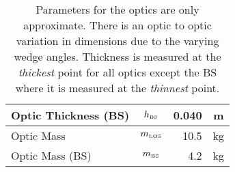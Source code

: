 \begin{table}[!h]
\begin{center}
\begin{tabular}{|l|c|r|c|}
Optic Thickness (BS)        & $h_{\mbox{\tiny BS}}$    & 0.040        & m           \\ \hline

Optic Mass              & $m_{\mbox{\tiny LOS}}$  & 10.5              & kg          \\ \hline

Optic Mass  (BS)          & $m_{\mbox{\tiny BS}}$  &  4.2             & kg          \\ \hline

\end{tabular}
\end{center}
\caption[Large Optic's Parameters]{Parameters for the optics are only approximate. 
                            There is an
                             optic to optic variation in dimensions due to the varying
                             wedge angles. Thickness is measured at the \emph{thickest}
                             point for all optics except the BS where it is measured at
                             the \emph{thinnest} point.}
\label{t:LOS}
\end{table}

\clearpage

